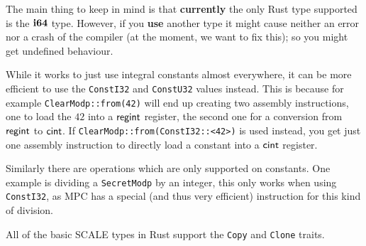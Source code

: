 The main thing to keep in mind is that {\bf currently} the only
Rust type supported is the $\mathbf{i64}$ type.
However, if you {\bf use} another type it might cause neither an error nor a crash
of the compiler (at the moment, we want to fix this); so you
might get undefined behaviour.

While it works to just use integral constants almost everywhere,
it can be more efficient to use the \verb|ConstI32| and \verb|ConstU32| values
instead. This is because for example \verb|ClearModp::from(42)| will end
up creating two assembly instructions, one to load the $42$ into a
$\mathsf{regint}$ register, the second one for a conversion from $\mathsf{regint}$ to
$\mathsf{cint}$. If \verb|ClearModp::from(ConstI32::<42>)| is used instead, you
get just one assembly instruction to directly load a constant into a
$\mathsf{cint}$ register.

Similarly there are operations which are only supported on constants.
One example is dividing a \verb|SecretModp| by an integer, this only works
when using \verb|ConstI32|, as MPC has a special (and thus very efficient)
instruction for this kind of division.

All of the basic SCALE types in Rust support the \verb|Copy| and \verb|Clone| traits.


\newpage

\newpage

\newpage

\newpage

\newpage

